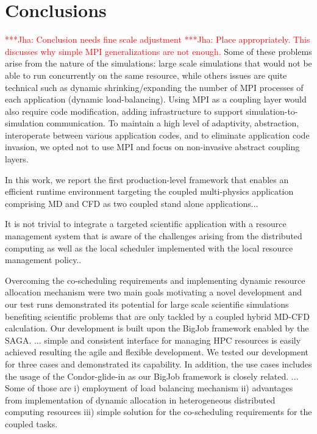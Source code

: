 \documentclass[conference,final]{IEEEtran}
\newcommand{\jhanote}[1]{ {\textcolor{red} { ***Jha: #1 }}}
\newcommand{\jhanote}[1]{}
\begin{document}
\section{Conclusions}

\jhanote{Conclusion needs fine scale adjustment} \jhanote{Place
  appropriately. This discusses why simple MPI generalizations are not
  enough.} Some of these problems arise from the nature of the
simulations: large scale simulations that would not be able to run
concurrently on the same resource, while others issues are quite
technical such as dynamic shrinking/expanding the number of MPI
processes of each application (dynamic load-balancing). Using MPI as a
coupling layer would also require code modification, adding
infrastructure to support simulation-to-simulation communication. To
maintain a high level of adaptivity, abstraction, interoperate between
various application codes, and to eliminate application code invasion,
we opted not to use MPI and focus on non-invasive abstract coupling
layers.

In this work, we report the first production-level framework that
enables an efficient runtime environment targeting the coupled
multi-physics application comprising MD and CFD as two coupled stand
alone applications...

It is not trivial to integrate a targeted scientific application with
a resource management system that is aware of the challenges arising
from the distributed computing as well as the local scheduler
implemented with the local resource management policy..

Overcoming the co-scheduling requirements and implementing dynamic
resource allocation mechanism were two main goals motivating a novel
development and our test runs demonstrated its potential for large
scale scientific simulations benefiting scientific problems that are
only tackled by a coupled hybrid MD-CFD calculation.  Our development
is built upon the BigJob framework enabled by the SAGA. ... simple and
consistent interface for managing HPC resources is easily achieved
resulting the agile and flexible development. We tested our
development for three cases and demonstrated its capability. In
addition, the use cases includes the usage of the Condor-glide-in as
our BigJob framework is closely related. ... Some of those are i)
employment of load balancing mechanism ii) advantages from
implementation of dynamic allocation in heterogeneous distributed
computing resources iii) simple solution for the co-scheduling
requirements for the coupled tasks.
\end{document}
